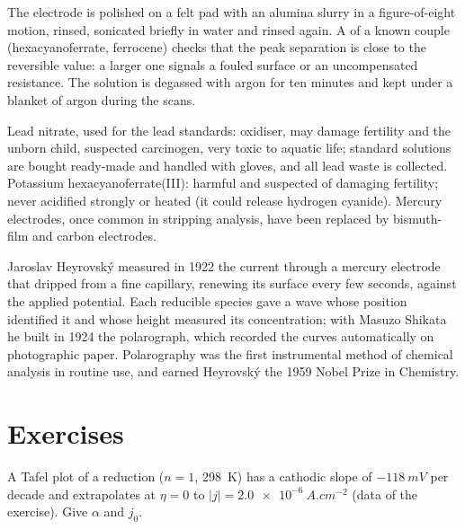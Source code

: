 \begin{inthelab}
The electrode is polished on a felt pad with an alumina slurry in a
figure-of-eight motion, rinsed, sonicated briefly in water and rinsed again. A
 of a known couple (hexacyanoferrate, ferrocene) checks that the
peak separation is close to the reversible value: a larger one signals a
fouled surface or an uncompensated resistance. The solution is degassed with
argon for ten minutes and kept under a blanket of argon during the scans.
\end{inthelab}

\begin{safety}{}
Lead nitrate, used for the lead standards: oxidiser, may damage fertility and
the unborn child, suspected carcinogen, very toxic to aquatic life; standard
solutions are bought ready-made and handled with gloves, and all lead waste is
collected. Potassium hexacyanoferrate(III): harmful and suspected of damaging
fertility; never acidified strongly or heated (it could release hydrogen
cyanide). Mercury electrodes, once common in stripping analysis, have been
replaced by bismuth-film and carbon electrodes.
\end{safety}

\begin{history}
Jaroslav Heyrovský measured in 1922 the current through a mercury electrode
that dripped from a fine capillary, renewing its surface every few seconds,
against the applied potential. Each reducible species gave a wave whose
position identified it and whose height measured its concentration; with
Masuzo Shikata he built in 1924 the polarograph, which recorded the curves
automatically on photographic paper. Polarography was the first instrumental
method of chemical analysis in routine use, and earned Heyrovský the 1959 Nobel
Prize in Chemistry.
\end{history}

\section{Exercises}

\begin{exercise}[$\star$]\label{exo:b3:electrode-kinetics:1}
A Tafel plot of a reduction ($n = 1$, \qty{298}{K}) has a cathodic slope of $-\qty{118}{mV}$
per decade and extrapolates at $\eta = 0$ to $|j| = \qty{2.0e-6}{A.cm^{-2}}$ (data of the exercise).
Give $\alpha$ and $j_0$.
\end{exercise}

